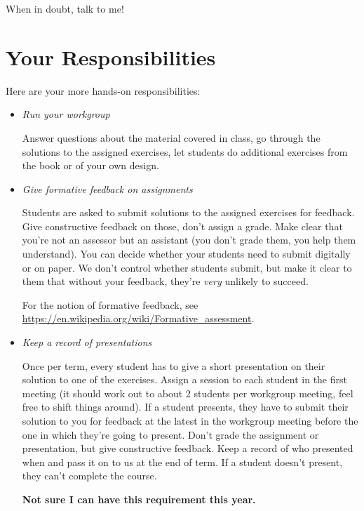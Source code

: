 \documentclass[a4paper,11pt,notitlepage]{uureport}
\begin{document}
When in doubt, talk to me!

\section*{Your Responsibilities}

Here are your more hands-on responsibilities:

	\begin{itemize}
	
		\item \emph{Run your workgroup}
		
		Answer questions about the material covered in class,
		go through the solutions to the assigned exercises,
		let students do additional exercises from the book or of your own design.
		
		\item \emph{Give formative feedback on assignments}
		
		Students are asked to submit solutions to the assigned exercises for feedback.
		Give constructive feedback on those, don't assign a grade.
		Make clear that you're not an assessor but an assistant (you don't grade them, you help them understand).
		You can decide whether your students need to submit digitally or on paper.
		We don't control whether students submit, but make it clear to them that without your feedback, they're \emph{very} unlikely to succeed.
		
		For the notion of formative feedback, see \url{https://en.wikipedia.org/wiki/Formative_assessment}.
		
		\item \emph{Keep a record of presentations}
		
		Once per term, every student has to give a short presentation on their solution to one of the exercises. Assign a session to each student in the first meeting (it should work out to about 2 students per workgroup meeting, feel free to shift things around). If a student presents, they have to submit their solution to you for feedback at the latest in the workgroup meeting before the one in which they're going to present. Don't grade the assignment or presentation, but give constructive feedback. Keep a record of who presented when and pass it on to us at the end of term. If a student doesn't present, they can't complete the course.

	 	\textbf{Not sure I can have this requirement this year.}
		

\end{itemize}
\end{document}
